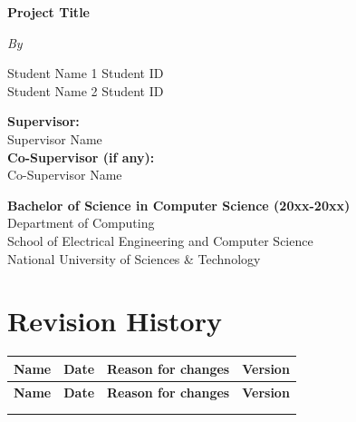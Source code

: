 \documentclass[12pt,a4paper]{report}
\begin{document}
\begin{titlepage}
    \centering
    \vspace*{2cm}
    
    {\Huge\bfseries Project Title\par}
    \vspace{1cm}
    {\Large\itshape By\par}
    \vspace{1cm}
    
    {\large
    Student Name 1 \hspace{2cm} Student ID\\
    Student Name 2 \hspace{2cm} Student ID\\
    }
    \vspace{2cm}
    
    {\large
    \textbf{Supervisor:}\\
    Supervisor Name\\
    \vspace{0.5cm}
    \textbf{Co-Supervisor (if any):}\\
    Co-Supervisor Name\\
    }
    \vfill
    
    {\large
    \textbf{Bachelor of Science in Computer Science (20xx-20xx)}\\
    \vspace{0.5cm}
    Department of Computing\\
    School of Electrical Engineering and Computer Science\\
    National University of Sciences \& Technology\\
    }
    \vspace{1cm}
\end{titlepage}

\tableofcontents
\listoftables
\listoffigures

\chapter*{Revision History}

\begin{longtable}{|p{3cm}|p{3cm}|p{5cm}|p{2cm}|}
\hline
\textbf{Name} & \textbf{Date} & \textbf{Reason for changes} & \textbf{Version} \\
\hline
\endfirsthead
\hline
\textbf{Name} & \textbf{Date} & \textbf{Reason for changes} & \textbf{Version} \\
\hline
\endhead
 & & & \\
\hline
 & & & \\
\hline
\end{longtable}
\end{document}
